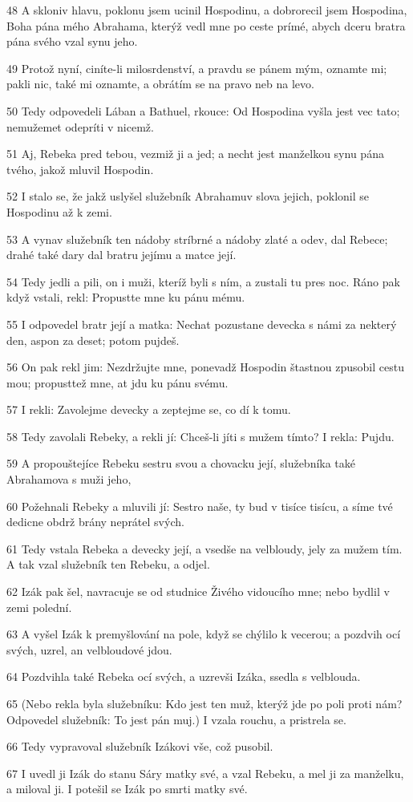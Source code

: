 \par 48 A skloniv hlavu, poklonu jsem ucinil Hospodinu, a dobrorecil jsem Hospodina, Boha pána mého Abrahama, kterýž vedl mne po ceste prímé, abych dceru bratra pána svého vzal synu jeho.
\par 49 Protož nyní, ciníte-li milosrdenství, a pravdu se pánem mým, oznamte mi; pakli nic, také mi oznamte, a obrátím se na pravo neb na levo.
\par 50 Tedy odpovedeli Lában a Bathuel, rkouce: Od Hospodina vyšla jest vec tato; nemužemet odepríti v nicemž.
\par 51 Aj, Rebeka pred tebou, vezmiž ji a jed; a necht jest manželkou synu pána tvého, jakož mluvil Hospodin.
\par 52 I stalo se, že jakž uslyšel služebník Abrahamuv slova jejich, poklonil se Hospodinu až k zemi.
\par 53 A vynav služebník ten nádoby stríbrné a nádoby zlaté a odev, dal Rebece; drahé také dary dal bratru jejímu a matce její.
\par 54 Tedy jedli a pili, on i muži, kteríž byli s ním, a zustali tu pres noc. Ráno pak když vstali, rekl: Propustte mne ku pánu mému.
\par 55 I odpovedel bratr její a matka: Nechat pozustane devecka s námi za nekterý den, aspon za deset; potom pujdeš.
\par 56 On pak rekl jim: Nezdržujte mne, ponevadž Hospodin štastnou zpusobil cestu mou; propusttež mne, at jdu ku pánu svému.
\par 57 I rekli: Zavolejme devecky a zeptejme se, co dí k tomu.
\par 58 Tedy zavolali Rebeky, a rekli jí: Chceš-li jíti s mužem tímto? I rekla: Pujdu.
\par 59 A propouštejíce Rebeku sestru svou a chovacku její, služebníka také Abrahamova s muži jeho,
\par 60 Požehnali Rebeky a mluvili jí: Sestro naše, ty bud v tisíce tisícu, a síme tvé dedicne obdrž brány neprátel svých.
\par 61 Tedy vstala Rebeka a devecky její, a vsedše na velbloudy, jely za mužem tím. A tak vzal služebník ten Rebeku, a odjel.
\par 62 Izák pak šel, navracuje se od studnice Živého vidoucího mne; nebo bydlil v zemi polední.
\par 63 A vyšel Izák k premyšlování na pole, když se chýlilo k vecerou; a pozdvih ocí svých, uzrel, an velbloudové jdou.
\par 64 Pozdvihla také Rebeka ocí svých, a uzrevši Izáka, ssedla s velblouda.
\par 65 (Nebo rekla byla služebníku: Kdo jest ten muž, kterýž jde po poli proti nám? Odpovedel služebník: To jest pán muj.) I vzala rouchu, a pristrela se.
\par 66 Tedy vypravoval služebník Izákovi vše, což pusobil.
\par 67 I uvedl ji Izák do stanu Sáry matky své, a vzal Rebeku, a mel ji za manželku, a miloval ji. I potešil se Izák po smrti matky své.

